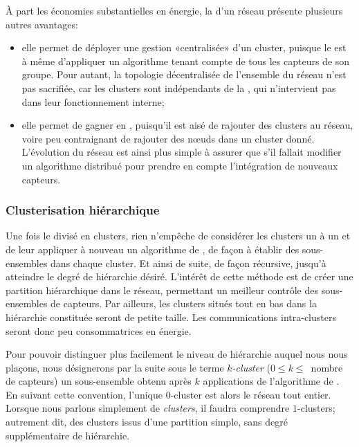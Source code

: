 À part les économies substantielles en énergie, la  d'un réseau présente plusieurs autres avantages:
\begin{itemize}
    \item elle permet de déployer une gestion «centralisée» d'un cluster, puisque le \ch est à même d'appliquer un algorithme tenant compte de tous les capteurs de son groupe. Pour autant, la topologie décentralisée de l'ensemble du réseau n'est pas sacrifiée, car les clusters sont indépendants de la \sdb, qui n'intervient pas dans leur fonctionnement interne;
    \item elle permet de gagner en , puisqu'il est aisé de rajouter des clusters au réseau, voire peu contraignant de rajouter des nœuds dans un cluster donné. L'évolution du réseau est ainsi plus simple à assurer que s'il fallait modifier un algorithme distribué pour prendre en compte l'intégration de nouveaux capteurs.
\end{itemize}

        \subsubsection{Clusterisation hiérarchique}
Une fois le \rc divisé en clusters, rien n'empêche de considérer les clusters un à un et de leur appliquer à nouveau un algorithme de , de façon à établir des sous-ensembles dans chaque cluster.
Et ainsi de suite, de façon récursive, jusqu'à atteindre le degré de hiérarchie désiré.
L'intérêt de cette méthode est de créer une partition hiérarchique dans le réseau, permettant un meilleur contrôle des sous-ensembles de capteurs.
Par ailleurs, les clusters situés tout en bas dans la hiérarchie constituée seront de petite taille.
Les communications intra-clusters seront donc peu consommatrices en énergie.

Pour pouvoir distinguer plus facilement le niveau de hiérarchie auquel nous nous plaçons, nous désignerons par la suite sous le terme \textit{$k$-cluster} ($0 \leq k \leq$~nombre de capteurs) un sous-ensemble obtenu après $k$ applications de l'algorithme de .
En suivant cette convention, l'unique $0$-cluster est alors le réseau tout entier.
Lorsque nous parlons simplement de \textit{clusters}, il faudra comprendre $1$-clusters; autrement dit, des clusters issus d'une partition simple, sans degré supplémentaire de hiérarchie.


